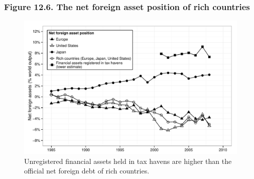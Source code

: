 \documentclass[t]{beamer}\usepackage[]{graphicx}\usepackage[]{color}
\newenvironment{knitrout}{}{} %
\begin{document}
\begin{frame}[label=Figure_12_6]
\frametitle{Figure 12.6. The net foreign asset position of rich countries}
\begin{figure}[t]
\begin{minipage}[b]{\textwidth}
\centering
\begin{knitrout}\footnotesize
{}\color{fgcolor}

{\centering \includegraphics[width=1\linewidth]{figures/bw/Figure_12_6} 

}



\end{knitrout}
\caption{Unregistered financial assets held in tax havens are higher than the official net foreign debt of rich countries.}
\end{minipage}
\end{figure}
\end{frame}
\end{document}
